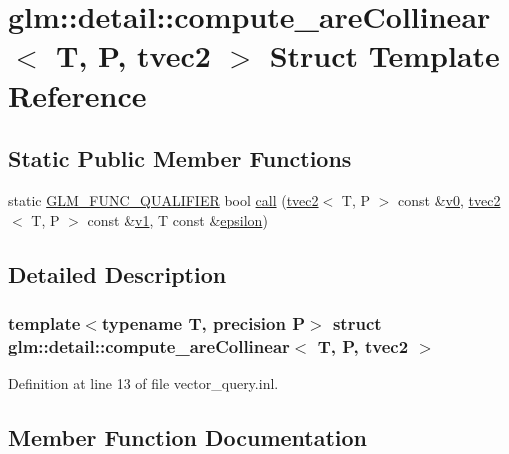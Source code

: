 \hypertarget{structglm_1_1detail_1_1compute__are_collinear_3_01_t_00_01_p_00_01tvec2_01_4}{}\section{glm\+::detail\+::compute\+\_\+are\+Collinear$<$ T, P, tvec2 $>$ Struct Template Reference}
\label{structglm_1_1detail_1_1compute__are_collinear_3_01_t_00_01_p_00_01tvec2_01_4}
\subsection*{Static Public Member Functions}
\begin{DoxyCompactItemize}
\item 
static \mbox{\hyperlink{setup_8hpp_a33fdea6f91c5f834105f7415e2a64407}{G\+L\+M\+\_\+\+F\+U\+N\+C\+\_\+\+Q\+U\+A\+L\+I\+F\+I\+ER}} bool \mbox{\hyperlink{structglm_1_1detail_1_1compute__are_collinear_3_01_t_00_01_p_00_01tvec2_01_4_acec3b10a2cf7e270c961f64e8d68de5c}{call}} (\mbox{\hyperlink{structglm_1_1tvec2}{tvec2}}$<$ T, P $>$ const \&\mbox{\hyperlink{glad_8h_a7062a23d1d434121d4a88f530703d06a}{v0}}, \mbox{\hyperlink{structglm_1_1tvec2}{tvec2}}$<$ T, P $>$ const \&\mbox{\hyperlink{glad_8h_a0779c3b73f9aa3a0ac5b0139b5d291d9}{v1}}, T const \&\mbox{\hyperlink{group__gtc__constants_ga2a1e57fc5592b69cfae84174cbfc9429}{epsilon}})
\end{DoxyCompactItemize}


\subsection{Detailed Description}
\subsubsection*{template$<$typename T, precision P$>$\newline
struct glm\+::detail\+::compute\+\_\+are\+Collinear$<$ T, P, tvec2 $>$}



Definition at line 13 of file vector\+\_\+query.\+inl.



\subsection{Member Function Documentation}
\mbox{\label{structglm_1_1detail_1_1compute__are_collinear_3_01_t_00_01_p_00_01tvec2_01_4_acec3b10a2cf7e270c961f64e8d68de5c}} 
